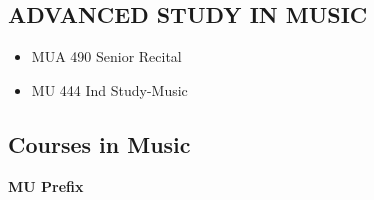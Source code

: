 \documentclass[
  letterpaper,
]{scrbook}
\providecommand{\tightlist}{%
  \setlength{\itemsep}{0pt}\setlength{\parskip}{0pt}}
\begin{document}
\subsection{ADVANCED STUDY IN MUSIC}\label{advanced-study-in-music}

\begin{itemize}
\tightlist
\item
  MUA 490 Senior Recital
\item
  MU 444 Ind Study-Music
\end{itemize}

\subsection{Courses in Music}\label{sec-courses-in-music}

\textbf{MU Prefix}
\end{document}
